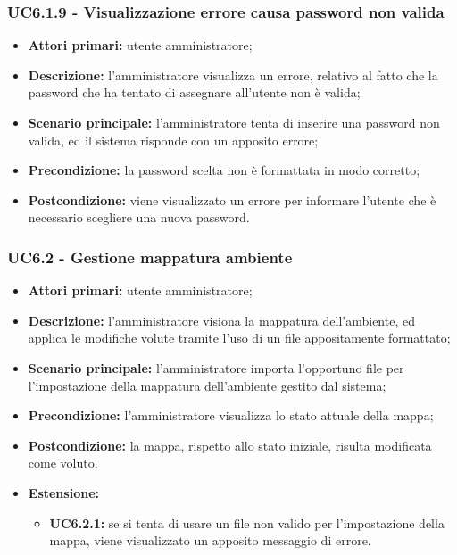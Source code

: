 \subsubsection{UC6.1.9 - Visualizzazione errore causa password non valida}
	\begin{itemize}
		\item \textbf{Attori primari:} utente amministratore;
		\item \textbf{Descrizione:} l'amministratore visualizza un errore, relativo al fatto che la password che ha tentato di assegnare all'utente non è valida;
		\item \textbf{Scenario principale:} l'amministratore tenta di inserire una password non valida, ed il sistema risponde con un apposito errore;
		\item \textbf{Precondizione:} la password scelta non è formattata in modo corretto;
		\item \textbf{Postcondizione:} viene visualizzato un errore per informare l'utente che è necessario scegliere una nuova password.
	\end{itemize}

\subsubsection{UC6.2 - Gestione mappatura ambiente}
	\begin{itemize}
		\item \textbf{Attori primari:} utente amministratore;
		\item \textbf{Descrizione:} l'amministratore visiona la mappatura dell'ambiente, ed applica le modifiche volute tramite l'uso di un file appositamente formattato;
		\item \textbf{Scenario principale:} l'amministratore importa l'opportuno file per l'impostazione della mappatura dell'ambiente gestito dal sistema;
		\item \textbf{Precondizione:} l'amministratore visualizza lo stato attuale della mappa;
		\item \textbf{Postcondizione:} la mappa, rispetto allo stato iniziale, risulta modificata come voluto.
		\item \textbf{Estensione:}
		\begin{itemize}
			\item \textbf{UC6.2.1:} se si tenta di usare un file non valido per l'impostazione della mappa, viene visualizzato un apposito messaggio di errore.
		\end{itemize}
	\end{itemize}

